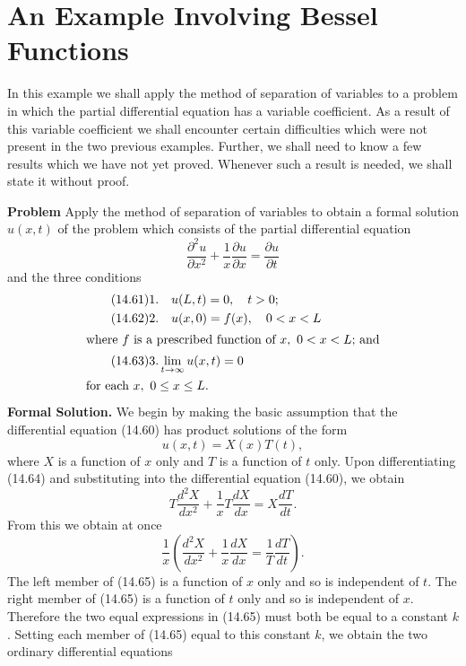 \documentclass[11pt,a4paper, twoside]{report}
\begin{document}
	\section*{An Example Involving Bessel Functions}
	In this example we shall apply the method of separation of variables to a problem in which the partial differential equation has a variable coefficient. As a result of this variable coefficient we shall encounter certain difficulties which were not present in the two previous examples. Further, we shall need to know a few results which we have not yet proved. Whenever such a result is needed, we shall state it without proof.\par
	\textbf{Problem} Apply the method of separation of variables to obtain a formal solution $u(x, t)$ of the problem which consists of the partial differential equation
	\begin{equation}\tag{14.60}
		\frac{\partial^2 u}{\partial x^2} + \frac{1}{x}\frac{\partial u}{\partial x} = \frac{\partial u}{\partial t}
	\end{equation}
	and the three conditions
	\begin{align}
		\tag{14.61}
		& 1.\quad u(L, t) = 0,\quad t>0;\\
		\tag{14.62}
		& 2.\quad u(x, 0) = f(x),\quad 0 < x < L\\
		\shortintertext{where $f$ is a prescribed function of $x,\ 0 < x < L$; and}
		\tag{14.63}
		& 3. \lim_{t\to \infty}u(x, t) = 0\\
		\shortintertext{for each $x,\ 0 \leq x \leq L$.}
	\end{align}
	\textbf{Formal Solution.} We begin by making the basic assumption that the differential equation (14.60) has product solutions of the form
	\begin{equation}\tag{14.64}
		u(x, t) = X(x)T(t),
	\end{equation}
	where $X$ is a function of $x$ only and $T$ is a function of $t$ only. Upon differentiating (14.64) and substituting into the differential equation (14.60), we obtain
	$$
	T\frac{d^2X}{dx^2} + \frac{1}{x}T\frac{dX}{dx} = X\frac{dT}{dt}.
	$$
	From this we obtain at once
	\begin{equation}\tag{14.65}
		\frac{1}{x}\left(\frac{d^2X}{dx^2} + \frac{1}{x}\frac{dX}{dx} = \frac{1}{T}\frac{dT}{dt}\right).
	\end{equation}
	The left member of (14.65) is a function of $x$ only and so is independent of $t$. The right member of (14.65) is a function of $t$ only and so is independent of $x$. Therefore the two equal expressions in (14.65) must both be equal to a constant $k$. Setting each member of (14.65) equal to this constant $k$, we obtain the two ordinary differential equations
\end{document}
